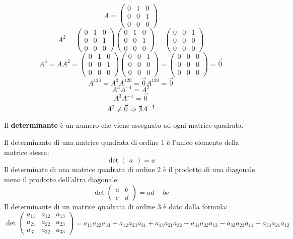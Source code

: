 \begin{example}
  $$A=\begin{pmatrix}
      0 & 1 & 0 \\
      0 & 0 & 1 \\
      0 & 0 & 0 
    \end{pmatrix}$$
  $$A^2=\begin{pmatrix}
      0 & 1 & 0 \\
      0 & 0 & 1 \\
      0 & 0 & 0 
    \end{pmatrix}\begin{pmatrix}
      0 & 1 & 0 \\
      0 & 0 & 1 \\
      0 & 0 & 0 
    \end{pmatrix}=\begin{pmatrix}
      0 & 0 & 1 \\
      0 & 0 & 0 \\
      0 & 0 & 0 
    \end{pmatrix}$$
  $$A^3=AA^2=\begin{pmatrix}
      0 & 1 & 0 \\
      0 & 0 & 1 \\
      0 & 0 & 0 
    \end{pmatrix}\begin{pmatrix}
      0 & 0 & 1 \\
      0 & 0 & 0 \\
      0 & 0 & 0 
    \end{pmatrix}=\begin{pmatrix}
      0 & 0 & 0 \\
      0 & 0 & 0 \\
      0 & 0 & 0 
    \end{pmatrix}=\vec{0}$$
  $$A^{123}=A^3A^{120}=\vec{0}A^{120}=\vec{0}$$
  $$A^3A^{-1}=A^2$$
  $$A^3A^{-1}=\vec{0}$$
  $$A^2\neq \vec{0}\Rightarrow \nexists A^{-1}$$
\end{example}

\begin{definition}[Determinante]
  Il \textbf{determinante} è un numero che viene assegnato ad ogni matrice quadrata.
\end{definition}

Il determinante di una matrice quadrata di ordine 1 è l'unico elemento della matrice stessa:
$$\det\begin{pmatrix}a\end{pmatrix}=a$$
Il determinate di una matrice quadrata di ordine 2 è il prodotto di una diagonale meno il prodotto dell'altra diagonale:
$$\det\begin{pmatrix}a & b \\ c & d\end{pmatrix}=ad-bc$$
Il determinante di un matrice quadrata di ordine 3 è dato dalla formula:
$$\det\begin{pmatrix}a_{11}&a_{12}&a_{13}\\a_{21}&a_{22}&a_{23}\\a_{31}&a_{32}&a_{33}\end{pmatrix}=a_{11}a_{22}a_{33}+a_{12}a_{23}a_{31}+a_{13}a_{21}a_{32}-a_{31}a_{22}a_{13}-a_{32}a_{23}a_{11}-a_{33}a_{21}a_{12}$$

